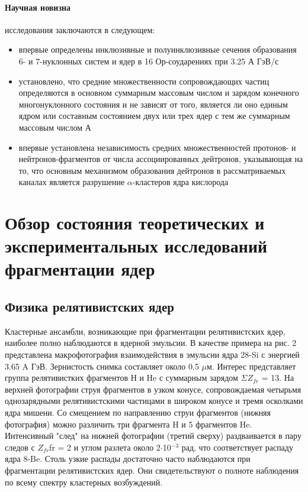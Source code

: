 \documentclass[fontsize=14pt]{scrarticle}
\begin{document}
\paragraph{Научная новизна} исследования заключаются в следующем:
\begin{itemize}
    \item впервые определены инклюзивные и полуинклюзивные сечения
образования 6- и 7-нуклонных систем и ядер в 16 Ор-соударениях при 3.25 А ГэВ/с
    \item установлено, что средние множественности сопровождающих частиц определяются в основном суммарным массовым числом и зарядом конечного многонуклонного состояния и не зависят от того, является ли оно единым ядром или составным состоянием двух или трех ядер с тем же суммарным массовым числом А
    \item впервые установлена независимость средних множественностей протонов- и нейтронов-фрагментов от числа ассоциированных дейтронов, указывающая на то, что основным механизмом образования дейтронов в рассматриваемых каналах является разрушение $\alpha$-кластеров ядра кислорода
\end{itemize}

\section{Обзор состояния теоретических и экспериментальных исследований фрагментации ядер}	
\subsection{Физика релятивистских ядер}	
\hspace{0.6cm}

Кластерные ансамбли, возникающие при фрагментации релятивистских ядер, наиболее полно наблюдаются в ядерной эмульсии. В качестве примера на рис. 2 представлена макрофотография взаимодействия в эмульсии ядра 28-Si с энергией 3.65 A ГэВ. Зернистость снимка составляет около 0.5 $\mu$м. Интерес представляет группа релятивистких фрагментов Н и He с суммарным зарядом $\Sigma Z_{fr}$ = 13. На верхней фотографии струя фрагментов в узком конусе, сопровождаемая четырьмя однозарядными релятивистскими частицами в широком конусе и тремя осколками ядра мишени. Со смещением по направлению струи фрагментов (нижняя фотография) можно различить три фрагмента H и 5 фрагментов He. Интенсивный "след" на нижней фотографии (третий сверху) раздваивается в пару следов с $Z_{fr}$fr = 2 и углом разлета около 2$\cdot$10$^{-3}$ рад, что соответствует распаду ядра 8-Be. Столь узкие распады достаточно часто наблюдаются при фрагментации релятивистских ядер. Они свидетельствуют о полноте
наблюдения по всему спектру кластерных возбуждений. 
	
\end{document}
